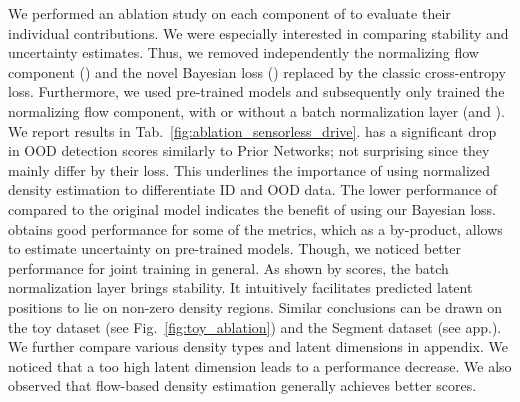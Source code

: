 We performed an ablation study on each component of \PostNetacro to evaluate their individual contributions. We were especially interested in comparing stability and uncertainty estimates. Thus, we removed independently the normalizing flow component (\NoFlow) and the novel Bayesian loss (\NoUCE) replaced by the classic cross-entropy loss. Furthermore, we used pre-trained models and subsequently only trained the normalizing flow component, with or without a batch normalization layer (\SeqBn and \SeqNoBn). We report results in Tab.~\ref{fig:ablation_sensorless_drive}. \NoFlow has a significant drop in OOD detection scores similarly to Prior Networks; not surprising since they mainly differ by their loss. This underlines the importance of using normalized density estimation to differentiate ID and OOD data. The lower performance of \NoUCE compared to the original model indicates the benefit of using our Bayesian loss.
 \SeqBn obtains good performance for some of the metrics, which as a by-product, allows to estimate uncertainty on pre-trained models. Though, we noticed better performance for joint training in general. As shown by \SeqNoBn scores, the batch normalization layer brings stability. It intuitively facilitates predicted latent positions to lie on non-zero density regions. Similar conclusions can be drawn on the toy dataset (see Fig.~\ref{fig:toy_ablation}) and the Segment dataset (see app.). We further compare various density types and latent dimensions in appendix. We noticed that a too high latent dimension leads to a performance decrease. We also observed that flow-based density estimation generally achieves better scores.

